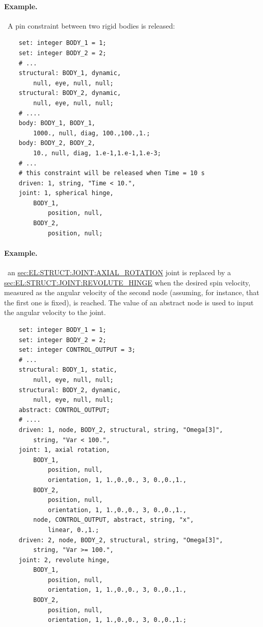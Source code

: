 \paragraph{Example.} \
A pin constraint between two rigid bodies is released:
\begin{verbatim}
    set: integer BODY_1 = 1;
    set: integer BODY_2 = 2;
    # ...
    structural: BODY_1, dynamic,
        null, eye, null, null;
    structural: BODY_2, dynamic,
        null, eye, null, null;
    # ....
    body: BODY_1, BODY_1,
        1000., null, diag, 100.,100.,1.;
    body: BODY_2, BODY_2,
        10., null, diag, 1.e-1,1.e-1,1.e-3;
    # ...
    # this constraint will be released when Time = 10 s
    driven: 1, string, "Time < 10.",
    joint: 1, spherical hinge,
        BODY_1,
            position, null,
        BODY_2,
            position, null;
\end{verbatim}

\paragraph{Example.} \
an
\hyperref{\kw{axial rotation}}{\kw{axial rotation} (see Section~}{)}{sec:EL:STRUCT:JOINT:AXIAL_ROTATION}
joint is replaced by a
\hyperref{\kw{revolute hinge}}{\kw{revolute hinge} (see Section~}{)}{sec:EL:STRUCT:JOINT:REVOLUTE_HINGE}
when the desired spin velocity, measured as the angular velocity
of the second node (assuming, for instance, that the first one is fixed),
is reached.
The value of an abstract node is used to input the angular velocity 
to the  joint.
\begin{verbatim}
    set: integer BODY_1 = 1;
    set: integer BODY_2 = 2;
    set: integer CONTROL_OUTPUT = 3;
    # ...
    structural: BODY_1, static,
        null, eye, null, null;
    structural: BODY_2, dynamic,
        null, eye, null, null;
    abstract: CONTROL_OUTPUT;
    # ....
    driven: 1, node, BODY_2, structural, string, "Omega[3]",
        string, "Var < 100.",
    joint: 1, axial rotation,
        BODY_1,
            position, null,
            orientation, 1, 1.,0.,0., 3, 0.,0.,1.,
        BODY_2,
            position, null,
            orientation, 1, 1.,0.,0., 3, 0.,0.,1.,
        node, CONTROL_OUTPUT, abstract, string, "x",
            linear, 0.,1.;
    driven: 2, node, BODY_2, structural, string, "Omega[3]",
        string, "Var >= 100.",
    joint: 2, revolute hinge,
        BODY_1,
            position, null,
            orientation, 1, 1.,0.,0., 3, 0.,0.,1.,
        BODY_2,
            position, null,
            orientation, 1, 1.,0.,0., 3, 0.,0.,1.;
\end{verbatim}

